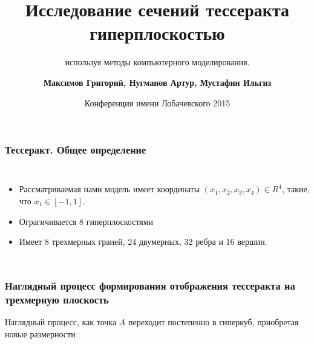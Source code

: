 \documentclass[10pt,pdf,hyperref={unicode}]{beamer}
\title[Исследование сечений тессеракта трехмерной гиперплоскостью с использованием методов компьютерного моделирования] %
{ \bfseries Исследование сечений тессеракта гиперплоскостью}
\subtitle{используя методы компьютерного моделирования.}
\author[Максимов Г., Нугманов А., Мустафин И.]
{ \bfseries Максимов Григорий, Нугманов Артур, Мустафин Ильгиз}
\institute[ТТЛ №2] %
{
  { \normalsize МАОУ "Лицей-интернат №2"} \\
  Московского района города Казани
}
\date[2015-03-26] %
{Конференция имени Лобачевского 2015}
\begin{document}
\frame{\titlepage}

\begin{frame}
\frametitle{Тессеракт. Общее определение}

\begin{columns}
	{\small
	\begin{itemize}
		\item Рассматриваемая нами модель имеет координаты $(x_1,x_2,x_3,x_4) \in R^4$, такие, что $x_1 \in [ -1,1 ]$. 
		\item Ограгичивается 8 гиперплоскостями	
		\item Имеет 8 трехмерных граней, 24 двумерных, 32 ребра и 16 вершин.
	\end{itemize}
}
	\clearpage
\end{columns}

\end{frame}
\begin{frame}
\frametitle{Наглядный процесс формирования отображения тессеракта на трехмерную плоскость}
\begin{center}
\end{center} 

Наглядный процесс, как точка $A$ переходит постепенно в гиперкуб, приобретая новые размерности
\end{frame}
\end{document}
